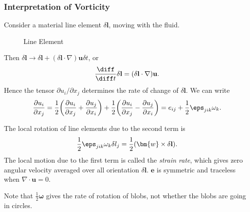 \documentclass[12pt]{article}
\begin{document}
\subsubsection{Interpretation of Vorticity}
\label{subsub:interpretation_of_vorticity}

Consider a material line element $\delta \mathbf{l}$, moving with the fluid.

\begin{figure}[h]
	\centering%
	\caption{Line Element}
	\label{fig:line_element}
\end{figure}

Then $\delta \mathbf{l} \to \delta \mathbf{l} + (\delta \mathbf{l} \cdot \nabla) \mathbf{u} \delta t$, or
\[
\frac{\diff}{\diff t} \delta \mathbf{l} = (\delta \mathbf{l} \cdot \nabla) \mathbf{u}
.\]
Hence the tensor $\partial u_i/\partial x_j$ determines the rate of change of $\delta \mathbf{l}$. We can write
\[
\frac{\partial u_i}{\partial x_j} = \frac{1}{2} \biggl( \frac{\partial u_i}{\partial x_j} + \frac{\partial u_j}{\partial x_i} \biggr) + \frac{1}{2} \biggl( \frac{\partial u_i}{\partial x_j} - \frac{\partial u_j}{\partial x_i} \biggr) = e_{ij} + \frac{1}{2} \eps_{jik} \omega_{k}
.\]


The local rotation of line elements due to the second term is
\[
\frac{1}{2} \eps_{jik}\omega_k \delta l_j = \frac{1}{2} (\bm{w} \times \delta \mathbf{l})
.\]
The local motion due to the first term is called the \emph{strain rate}, which gives zero angular velocity averaged over all orientation $\delta \mathbf{l}$. $\mathbf{e}$ is symmetric and traceless when $\nabla \cdot \mathbf{u} = 0$.

Note that $\frac{1}{2} \bm{\omega}$ gives the rate of rotation of blobs, not whether the blobs are going in circles.

\newpage

\printindex
\end{document}
